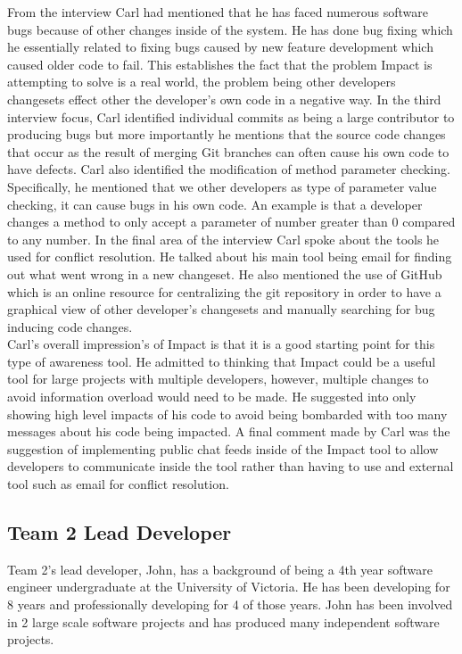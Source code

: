 \documentclass[conference]{IEEEtran}
\begin{document}
From the interview Carl had mentioned that he has faced numerous software bugs because of other changes
inside of the system. He has done bug fixing which he essentially related to fixing bugs caused by new
feature development which caused older code to fail. This establishes the fact that the problem Impact
is attempting to solve is a real world, the problem being other developers changesets effect other the
developer's own code in a negative way. In the third interview focus, Carl identified individual commits
as being a large contributor to producing bugs but more importantly he mentions that the source code
changes that occur as the result of merging Git branches can often cause his own code to have defects.
Carl also identified the modification of method parameter checking. Specifically, he mentioned that we
other developers as type of parameter value checking, it can cause bugs in his own code. An example is
that a developer changes a method to only accept a parameter of number greater than 0 compared to any
number. In the final area of the interview Carl spoke about the tools he used for conflict resolution. He
talked about his main tool being email for finding out what went wrong in a new changeset. He also
mentioned the use of GitHub which is an online resource for centralizing the git repository in order
to have a graphical view of other developer's changesets and manually searching for bug inducing 
code changes.\\ 

Carl's overall impression's of Impact is that it is a good starting point for this type of awareness tool.
He admitted to thinking that Impact could be a useful tool for large projects with multiple developers, however,
multiple changes to avoid information overload would need to be made. He suggested into only showing
high level impacts of his code to avoid being bombarded with too many messages about his code
being impacted. A final comment made by Carl was the suggestion of implementing public chat feeds
inside of the Impact tool to allow developers to communicate inside the tool rather than having to use
and external tool such as email for conflict resolution.\\

\subsection{Team 2 Lead Developer}
Team 2's lead developer, John, has a background of being a 4th year software engineer undergraduate
at the University of Victoria. He has been developing for 8 years and professionally developing for
4 of those years. John has been involved in 2 large scale software projects and has produced
many independent software projects.\\
\end{document}
